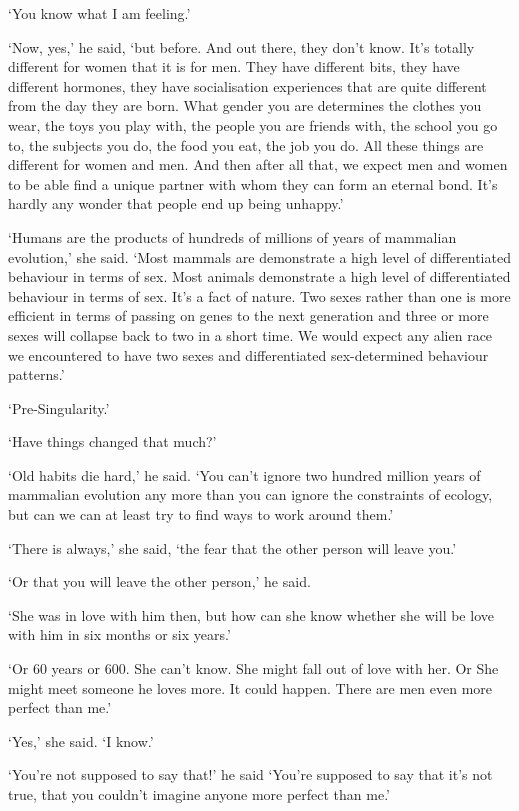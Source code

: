 `You know what I am feeling.'

`Now, yes,' he said, `but before. And out there, they don't know. It's totally
different for women that it is for men. They have different bits,
they have different hormones, they have socialisation experiences
that are quite different from the day they are born. What gender you
are determines the clothes you wear, the toys you play with, the
people you are friends with, the school you go to, the subjects you
do, the food you eat, the job you do. All these things are different
for women and men. And then after all that, we expect men and women
to be able find a unique partner with whom they can form an eternal
bond. It's hardly any wonder that people end up being unhappy.'

`Humans are the products of hundreds of millions of years of
mammalian evolution,' she said. `Most mammals are demonstrate a high level of differentiated behaviour in terms of sex. Most {\twelveit animals\/} demonstrate a high level of differentiated behaviour in terms of sex.
It's a fact
of nature. Two sexes rather than one is more efficient in terms
of passing on genes to the next generation and three or more sexes
will collapse back to two in a short time. We would
expect any alien race we encountered to have two sexes and
differentiated sex-determined behaviour patterns.'

`Pre-Singularity.'

`Have things changed that much?'

`Old habits die hard,' he said. `You can't ignore two hundred million years of
mammalian evolution any more than you can ignore the constraints of
ecology, but can we can at least try to find ways to work around
them.'

\majorbreak
`There is always,' she said, `the fear that the other person will leave you.'

`Or that you will leave the other person,' he said.

`She was in love with him then, but how can she know whether
she will be love with him in six months or six years.'

`Or 60 years or 600. She can't know. She might fall out of love with
her. Or She might meet someone he loves more. It could happen.
There are men even more perfect than me.'

`Yes,' she said. `I know.'

`You're not supposed to say that!' he said `You're supposed to say that it's
not true, that you couldn't imagine anyone more perfect than me.'

